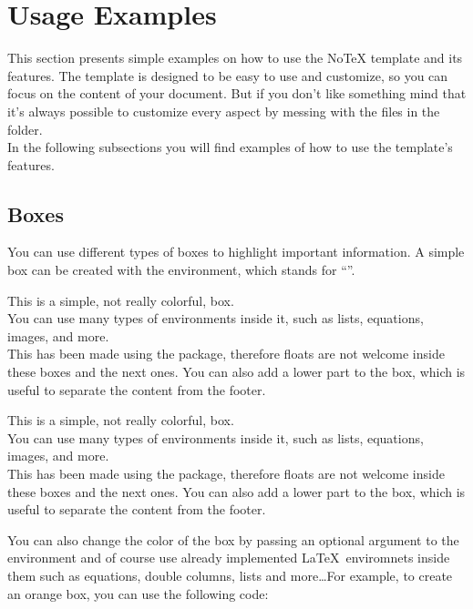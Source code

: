 \documentclass[../main.tex]{subfiles}
\begin{document}
\section{Usage Examples}

This section presents simple examples on how to use the NoTeX template and its
features. The template is designed to be easy to use and customize, so you can
focus on the content of your document. But if you don't like something mind that
it's always possible to customize every aspect by messing with the files in the
 folder.\\
In the following subsections you will find examples of how to use the template's
features.\\

\subsection{Boxes}

You can use different types of boxes to highlight important information. A
simple box can be created with the  environment, which stands for
``''.

\begin{cbox}
	This is a simple, not really colorful, box.\\
	You can use many types of environments inside it, such as lists, equations,
	images, and more.\\
	This has been made using the  package, therefore floats are not welcome inside these boxes and the next ones.
	\tcblower
	You can also add a lower part to the box, which is useful to separate the
	content from the footer.
\end{cbox}

\begin{ebox}[blue]
	This is a simple, not really colorful, box.\\
	You can use many types of environments inside it, such as lists, equations,
	images, and more.\\
	This has been made using the  package, therefore floats are not welcome inside these boxes and the next ones.
	\tcblower
	You can also add a lower part to the box, which is useful to separate the
	content from the footer.
\end{ebox}

You can also change the color of the box by passing an optional argument to the
 environment and of course use already implemented \LaTeX\ enviromnets
inside them such as equations, double columns, lists and more\dots For example, to create an orange box, you can use the following code:
\end{document}
